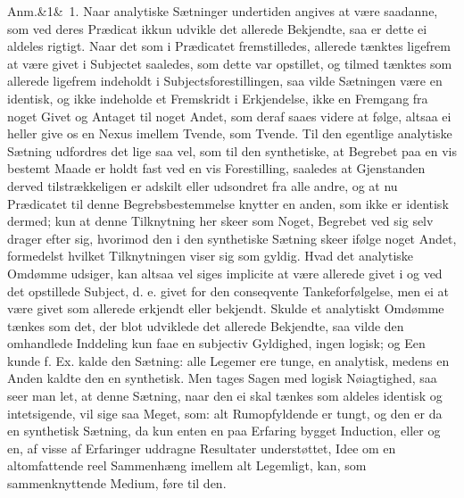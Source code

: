 \documentclass[12pt]{book}
\def\sperr#1{#1}%
\def\textit#1{#1}%
\newcommand{\sperr}[1]{\textls[180]{#1}}
\newcommand{\anm}[1]{%
  \par\vspace{0.5\baselineskip}%
  \noindent\hspace{\parindent}\sperr{Anm.}\ifx&#1&\else~\textit{#1}.\fi
  \enspace\ignorespaces
}
\newcommand{\opage}[1]{\marginnote{\footnotesize\textit{[#1]}}}
\begin{document}
\anm{1} Naar analytiske Sætninger undertiden angives at være saadanne, som ved
deres Prædicat ikkun udvikle det allerede Bekjendte, saa er dette ei aldeles
rigtigt. Naar det som i Prædicatet fremstilledes, allerede tænktes ligefrem at
være givet i Subjectet saaledes, som dette var opstillet, og tilmed tænktes som
allerede ligefrem indeholdt i Subjectsforestillingen, saa vilde Sætningen være
en identisk, og ikke indeholde et Fremskridt i Erkjendelse, ikke en
\opage{307} Fremgang fra noget Givet og Antaget til noget Andet, som deraf saaes videre at
følge, altsaa ei heller give os en Nexus imellem Tvende, som Tvende. Til den
egentlige analytiske Sætning udfordres det lige saa vel, som til den
synthetiske, at Begrebet paa en vis bestemt Maade er holdt fast ved en vis
Forestilling, saaledes at Gjenstanden derved tilstrækkeligen er adskilt eller
udsondret fra alle andre, og at nu Prædicatet til denne Begrebsbestemmelse
knytter en anden, som ikke er identisk dermed; kun at denne Tilknytning her
skeer som Noget, Begrebet ved sig selv drager efter sig, hvorimod den i den
synthetiske Sætning skeer ifølge noget Andet, formedelst hvilket Tilknytningen
viser sig som gyldig. Hvad det analytiske Omdømme udsiger, kan altsaa vel siges
\textit{implicite} at være allerede givet i og ved det opstillede Subject, d. e.
givet for den conseqvente Tankeforfølgelse, men ei at være givet som allerede
erkjendt eller bekjendt. Skulde et analytiskt Omdømme tænkes som det, der blot
udviklede det allerede Bekjendte, saa vilde den omhandlede Inddeling kun faae en
subjectiv Gyldighed, ingen logisk; og Een kunde f. Ex. kalde den Sætning: alle
Legemer ere tunge, en analytisk, medens en Anden kaldte den en synthetisk. Men
tages Sagen med logisk Nøiagtighed, saa seer man let, at denne Sætning, naar den
ei skal tænkes som aldeles identisk og intetsigende, vil sige saa Meget, som:
alt Rumopfyldende er tungt, og den er da en synthetisk Sætning, da kun
\opage{308} enten en paa Erfaring bygget Induction, eller og en, af visse af Erfaringer
uddragne Resultater understøttet, Idee om en altomfattende reel Sammenhæng
imellem alt Legemligt, kan, som sammenknyttende Medium, føre til den.
\end{document}
